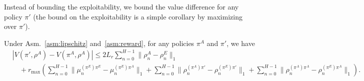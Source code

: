 \documentclass{article}
\begin{document}
Instead of bounding the exploitability, we bound the value difference for any policy $\pi'$ (the bound on the exploitability is a simple corollary by maximizing over $\pi'$).
\begin{lemma}
    \label{lem:value_diff}
    Under Asm.~\ref{asm:lipschitz} and~\ref{asm:reward}, for any policies $\pi^A$ and $\pi'$, we have
    \begin{align}
        &|V(\pi',\rho^A) - V(\pi^A,\rho^A)| 
        \leq
        2 L_r \sum_{n=0}^{H-1}  \|\rho_n^A - \rho_n^E\|_1
        \\
        &\quad  
        + r_\text{max} \left(\sum_{n=0}^{H-1} \|\mu_n^{(\pi^E)\pi^E} - \mu_n^{(\pi^E)\pi^A}\|_1
        +   \sum_{n=0}^{H-1} \|\rho_n^{(\pi^A)\pi'} - \rho_n^{(\pi^E)\pi'}\|_1
        +   \sum_{n=0}^{H-1} \|\rho_n^{(\pi^A)\pi^A} - \rho_n^{(\pi^E)\pi^A}\|_1\right).
    \end{align}
\end{lemma}
\end{document}
